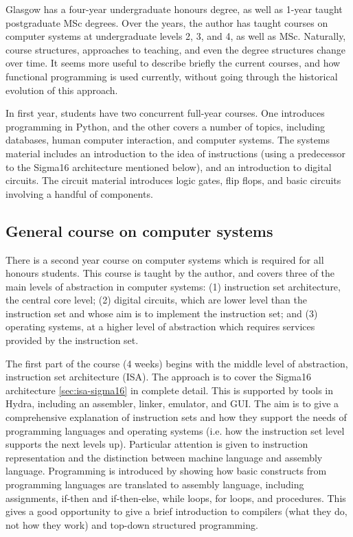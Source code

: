 \documentclass[submission,copyright,creativecommons]{eptcs}
\begin{document}
Glasgow has a four-year undergraduate honours degree, as well as
1-year taught postgraduate MSc degrees.  Over the years, the author
has taught courses on computer systems at undergraduate levels 2,
3, and 4, as well as MSc.  Naturally, course structures, approaches
to teaching, and even the degree structures change over time.  It
seems more useful to describe briefly the current courses, and how
functional programming is used currently, without going through the
historical evolution of this approach.

In first year, students have two concurrent full-year courses.  One
introduces programming in Python, and the other covers a number of
topics, including databases, human computer interaction, and
computer systems.  The systems material includes an introduction to
the idea of instructions (using a predecessor to the Sigma16
architecture mentioned below), and an introduction to digital
circuits.  The circuit material introduces logic gates, flip flops,
and basic circuits involving a handful of components.

\subsection{General course on computer systems}
\label{sec:CS2-course-topics}

There is a second year course on computer systems which is required
for all honours students.  This course is taught by the author, and
covers three of the main levels of abstraction in computer systems:
(1) instruction set architecture, the central core level; (2) digital
circuits, which are lower level than the instruction set and whose aim
is to implement the instruction set; and (3) operating systems, at a
higher level of abstraction which requires services provided by the
instruction set.

The first part of the course (4 weeks) begins with the middle level of
abstraction, instruction set architecture (ISA).  The approach is to
cover the Sigma16 architecture \ref{sec:isa-sigma16} in complete
detail.  This is supported by tools in Hydra, including an assembler,
linker, emulator, and GUI.  The aim is to give a comprehensive
explanation of instruction sets and how they support the needs of
programming languages and operating systems (i.e. how the instruction
set level supports the next levels up).  Particular attention is given
to instruction representation and the distinction between machine
language and assembly language.  Programming is introduced by showing
how basic constructs from programming languages are translated to
assembly language, including assignments, if-then and if-then-else,
while loops, for loops, and procedures.  This gives a good opportunity
to give a brief introduction to compilers (what they do, not how they
work) and top-down structured programming.
\end{document}
